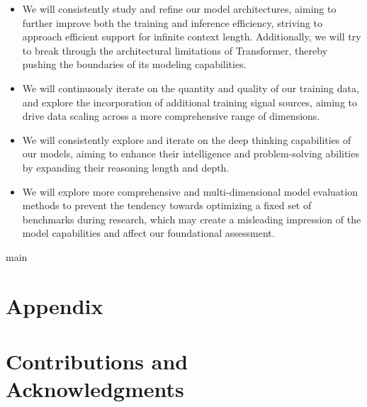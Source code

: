 \documentclass[11pt,a4paper]{article}
\begin{document}
\begin{itemize}
\item We will consistently study and refine our model architectures, aiming to further improve both the training and inference efficiency, striving to approach efficient support for infinite context length. 
    Additionally, we will try to break through the architectural limitations of Transformer, thereby pushing the boundaries of its modeling capabilities.
\item We will continuously iterate on the quantity and quality of our training data, and explore the incorporation of additional training signal sources, aiming to drive data scaling across a more comprehensive range of dimensions.
\item We will consistently explore and iterate on the deep thinking capabilities of our models, aiming to enhance their intelligence and problem-solving abilities by expanding their reasoning length and depth.
\item We will explore more comprehensive and multi-dimensional model evaluation methods to prevent the tendency towards optimizing a fixed set of benchmarks during research, which may create a misleading impression of the model capabilities and affect our foundational assessment.
\end{itemize}

main

\section{Appendix}

\section{Contributions and Acknowledgments}
\end{document}
